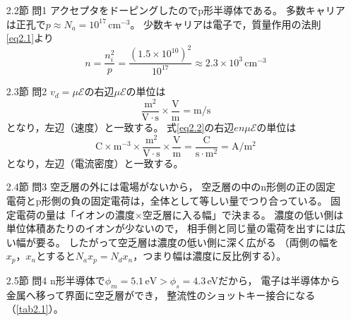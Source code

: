 \answer
\begin{enumerate}

\item[2.2節 問1]
アクセプタをドーピングしたのでp形半導体である。
多数キャリアは正孔で$p \approx N_a = 10^{17}\,\mathrm{cm^{-3}}$。
少数キャリアは電子で，質量作用の法則\ref{eq2.1}より
\begin{equation*}
n = \frac{n_i^2}{p} = \frac{(1.5\times10^{10})^2}{10^{17}}
\approx 2.3\times10^{3}\,\mathrm{cm^{-3}}
\end{equation*}

\item[2.3節 問2]
$v_d = \mu\mathcal{E}$の右辺$\mu\mathcal{E}$の単位は
\begin{equation*}
\frac{\mathrm{m^2}}{\mathrm{V\cdot s}}\times\frac{\mathrm{V}}{\mathrm{m}} = \mathrm{m/s}
\end{equation*}
となり，左辺（速度）と一致する。
式\ref{eq2.2}の右辺$en\mu\mathcal{E}$の単位は
\begin{equation*}
\mathrm{C}\times\mathrm{m^{-3}}\times\frac{\mathrm{m^2}}{\mathrm{V\cdot s}}\times\frac{\mathrm{V}}{\mathrm{m}}
= \frac{\mathrm{C}}{\mathrm{s\cdot m^2}} = \mathrm{A/m^2}
\end{equation*}
となり，左辺（電流密度）と一致する。

\item[2.4節 問3]
空乏層の外には電場がないから，
空乏層の中のn形側の正の固定電荷とp形側の負の固定電荷は，全体として等しい量でつり合っている。
固定電荷の量は「イオンの濃度$\times$空乏層に入る幅」で決まる。
濃度の低い側は単位体積あたりのイオンが少ないので，
相手側と同じ量の電荷を出すには広い幅が要る。
したがって空乏層は濃度の低い側に深く広がる
（両側の幅を$x_p$，$x_n$とすると$N_a x_p = N_d x_n$，つまり幅は濃度に反比例する）。

\item[2.5節 問4]
n形半導体で$\phi_m = 5.1\,\mathrm{eV} > \phi_s = 4.3$\,eVだから，
電子は半導体から金属へ移って界面に空乏層ができ，
整流性のショットキー接合になる（\ref{tab2.1}）。

\end{enumerate}
